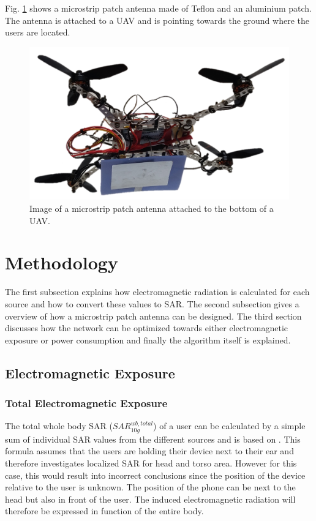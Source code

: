 \documentclass[twocolumn]{phdsymp} %
\begin{document}
Fig. \ref{fig:exampleDrone} shows a microstrip patch antenna made of Teflon and an 
aluminium patch. The antenna is attached to a \gls{UAV} and is pointing towards the ground where the users are located.

\begin{figure}[h]
\centering
  \includegraphics[width=0.8\linewidth]{drone.png}
  \caption{Image of a microstrip patch antenna attached to the bottom of a \gls{UAV}. }
  \label{fig:exampleDrone}
\end{figure}

\section{Methodology}

The first subsection explains how electromagnetic radiation is calculated for each source
and how to convert these values to \gls{SAR}. 
The second subsection gives a overview of how a microstrip patch antenna can be 
designed.
The third section discusses how the network can be optimized towards either electromagnetic 
exposure or power consumption and finally the algorithm itself is explained.

\subsection{Electromagnetic Exposure}
\subsubsection{Total Electromagnetic Exposure}
The total whole body SAR ($SAR^{wb,total}_{10g}$) of a user can be calculated by a simple sum of individual SAR values from the different sources
and is based on \cite{J17_kuehn2019modelling}. This formula assumes that the users are holding their device next to their ear and therefore 
investigates localized \gls{SAR} for head and torso area.
However for this case, this would result into incorrect conclusions since 
the position of the device relative to the user is unknown. 
The position of the phone can be next to the head but also in front of the user.
The induced electromagnetic radiation will therefore be expressed in function of the entire body.
\end{document}
